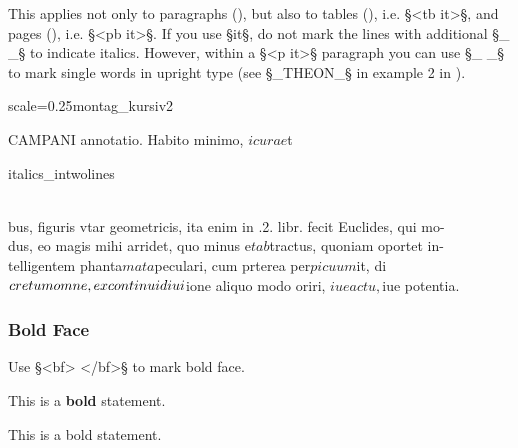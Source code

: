 \begin{clarification}
This applies not only to paragraphs (), but also to tables (), i.e. §<tb it>§, and pages (), i.e. §<pb it>§. If you use §it§, do not mark the lines with additional §_ _§ to indicate italics. However, within a §<p it>§ paragraph you can use §_ _§ to mark single words in upright type (see §_THEON_§ in example 2 in ).
\end{clarification}

\begin{sampleImageSmall}{scale=0.25}{montag_kursiv2}
\begin{typeLatin}
CAMPANI \bold{_}annotatio\bold{_}. Habito minimo, $i cura e$t
\end{typeLatin}
\end{sampleImageSmall}

\begin{sampleImage}{italics_intwolines}
\begin{typeLatin}
 \someText\\
bus, figuris vtar geometricis, ita enim in .2. libr. fecit Euclides, qui mo-\\
dus, eo magis mihi arridet, quo minus e$t ab$tractus, \bold{_}quoniam oportet in-\bold{_}\\
\bold{_}telligentem phanta$mata $peculari\bold{_}, cum prterea per$picuum $it, di$cretum\\
omne, ex continui diui$ione aliquo modo oriri, $iue actu, $iue potentia.\\
\someText {}
\end{typeLatin}
\end{sampleImage}


\subsubsection{Bold Face}
\label{section bold face}

\begin{mainruleLessImportant}
Use §<bf> </bf>§ to mark bold face.
\end{mainruleLessImportant}

\begin{example} 

\vspace{-4mm}
This is a \textbf{bold}  statement.

\begin{typeLatin}
This is a bold statement.
\end{typeLatin}
\end{example}

